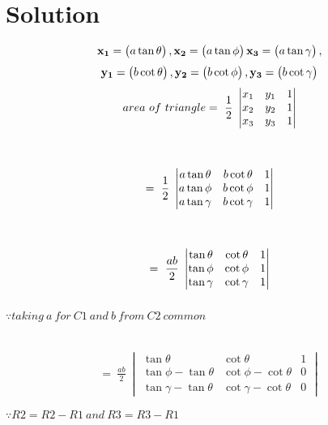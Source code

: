 \documentclass[journal,12pt,twocolumn]{IEEEtran}
\begin{document}
\section*{\textbf{Solution}}
\noindent
$$ \mathbf{x_1} = \begin{pmatrix}a\tan\theta\end{pmatrix}, \mathbf{x_2} = \begin{pmatrix}a\tan\phi\end{pmatrix}
\mathbf{x_3}=\begin{pmatrix}a\tan\gamma\end{pmatrix},$$
$$\mathbf{y_1}=\begin{pmatrix}b\cot\theta\end{pmatrix},\mathbf{y_2}=\begin{pmatrix}b\cot\phi\end{pmatrix},\mathbf{y_3}=\begin{pmatrix}b\cot\gamma\end{pmatrix}$$
\begin{multline}
area~ of ~triangle=~\frac{1}{2}\vspace{0.3cm}~\begin{vmatrix}
 x_{1} & y_{1} & 1  \\ 
 x_{2} & y_{2} & 1  \\
 x_{3} & y_{3} & 1 
\end{vmatrix}\end{multline}\\
\begin{multline}
=~\frac{1}{2}\vspace{0.3cm}~\begin{vmatrix}
 a\tan\theta & b\cot\theta & 1  \\ 
 a\tan\phi & b\cot\phi & 1  \\
 a\tan\gamma & b\cot\gamma & 1 
\end{vmatrix}\end{multline}\\
\begin{multline}
=~\frac{ab}{2}\vspace{0.3cm}~\begin{vmatrix}
 \tan\theta & \cot\theta & 1  \\ 
 \tan\phi &   \cot\phi & 1  \\
 \tan\gamma & \cot\gamma & 1 
\end{vmatrix}
\end{multline}
\begin{flushright}
$\because  taking ~a~ for ~C1 ~and~ b ~from~ C2~ common $
\end{flushright}

\\ \vspace{0.3cm}
\begin{multline}
=~\frac{ab}{2}~\begin{vmatrix}
 \tan\theta & \cot\theta & 1  \\ 
 \tan\phi-\tan\theta & \cot\phi-\cot\theta & 0  \\
 \tan\gamma-\tan\theta & \cot\gamma-\cot\theta & 0 
\end{vmatrix}\end{multline}
\begin{flushright}
$\because R2=R2-R1 ~and~ R3=R3-R1$
\end{flushright}
\end{document}
